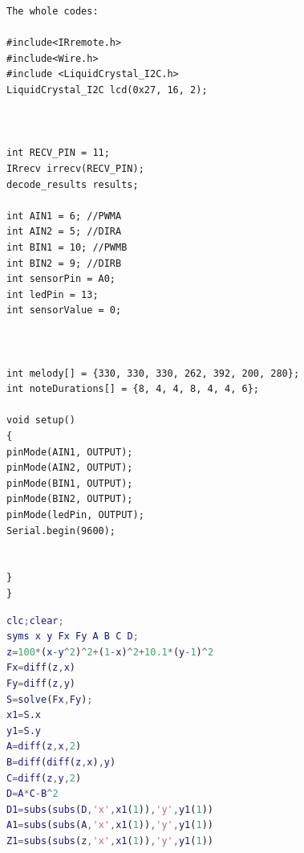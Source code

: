 \documentclass[12pt,a4paper]{report}
\begin{document}
%
%





\begin{appendices}
\begin{verbatim}
The whole codes:

#include<IRremote.h>
#include<Wire.h>
#include <LiquidCrystal_I2C.h>
LiquidCrystal_I2C lcd(0x27, 16, 2);



int RECV_PIN = 11; 
IRrecv irrecv(RECV_PIN); 
decode_results results; 

int AIN1 = 6; //PWMA
int AIN2 = 5; //DIRA
int BIN1 = 10; //PWMB
int BIN2 = 9; //DIRB
int sensorPin = A0; 
int ledPin = 13; 
int sensorValue = 0; 



int melody[] = {330, 330, 330, 262, 392, 200, 280};
int noteDurations[] = {8, 4, 4, 8, 4, 4, 6};

void setup() 
{
pinMode(AIN1, OUTPUT);
pinMode(AIN2, OUTPUT);
pinMode(BIN1, OUTPUT);
pinMode(BIN2, OUTPUT);
pinMode(ledPin, OUTPUT);
Serial.begin(9600);


}
}
\end{verbatim}

\begin{lstlisting}[language={MATLAB}, keywordstyle=\color{blue!70},commentstyle=\color{green!40!black},frame=shadowbox, rulesepcolor=\color{red!20!green!20!blue!20},basicstyle=\footnotesize]
%Justification via Matlab of function 36%
clc;clear;
syms x y Fx Fy A B C D;
z=100*(x-y^2)^2+(1-x)^2+10.1*(y-1)^2
Fx=diff(z,x)
Fy=diff(z,y)
S=solve(Fx,Fy);
x1=S.x
y1=S.y
A=diff(z,x,2)
B=diff(diff(z,x),y)
C=diff(z,y,2)
D=A*C-B^2
D1=subs(subs(D,'x',x1(1)),'y',y1(1))
A1=subs(subs(A,'x',x1(1)),'y',y1(1))
Z1=subs(subs(z,'x',x1(1)),'y',y1(1))
\end{lstlisting}

\end{appendices}
\end{document}
